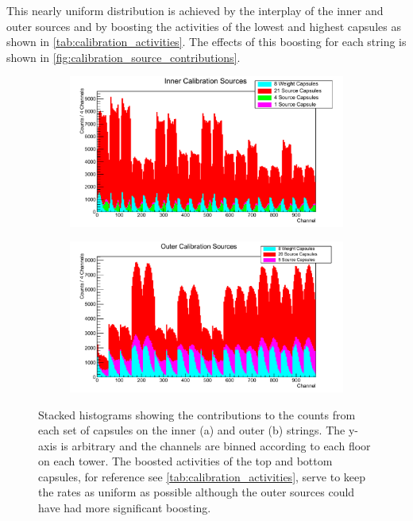 This nearly uniform distribution is achieved by the interplay of the inner and outer sources and by boosting the activities of the lowest and highest capsules as shown in \autoref{tab:calibration_activities}.
The effects of this boosting for each string is shown in \autoref{fig:calibration_source_contributions}.
\begin{figure}[htbp]
\centering
\begin{subfigure}[t]{0.9\textwidth}
\centering
\includegraphics[width=\textwidth]{Figures/InnerCalibrationSources.pdf}
\caption{}
\label{fig:inner_calibration_sources}
\end{subfigure}
\qquad
\begin{subfigure}[t]{0.9\textwidth}
\centering
\includegraphics[width=\textwidth]{Figures/OuterCalibrationSources.pdf}
\caption{}
\label{fig:outer_calibration_sources}
\end{subfigure}
\caption[Stacked histograms showing the contributions to the counts from each set of capsules on the inner (a) and outer (b) strings.]
{Stacked histograms showing the contributions to the counts from each set of capsules on the inner (a) and outer (b) strings.
The y-axis is arbitrary and the channels are binned according to each floor on each tower.
The boosted activities of the top and bottom capsules, for reference see \autoref{tab:calibration_activities}, serve to keep the rates as uniform as possible although the outer sources could have had more significant boosting.}
\label{fig:calibration_source_contributions}
\end{figure}
